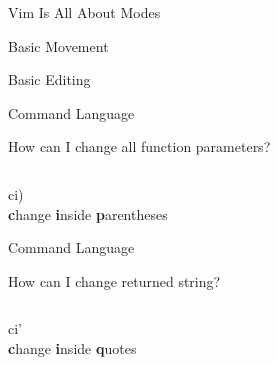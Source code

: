 \documentclass{beamer}
\begin{document}
\begin{frame}{Vim Is All About Modes}
\end{frame}
\usebackgroundtemplate{}

\begin{frame}{Basic Movement}
\end{frame}

\begin{frame}{Basic Editing}
\end{frame}


\begin{frame}{Command Language}
    \begin{block}{How can I change all function parameters?}
    \end{block}
    \inputminted{js}{codes/changeInsideParentheses.js}
    \pause
    \begin{center}
        \huge
        ci)
        \\
        \textbf{c}hange \textbf{i}nside \textbf{p}arentheses
    \end{center}
\end{frame}

\begin{frame}{Command Language}
    \begin{block}{How can I change returned string?}
    \end{block}
    \inputminted{js}{codes/changeInsideQuotes.js}
    \pause
    \begin{center}
        \huge
        ci'
        \\
        \textbf{c}hange \textbf{i}nside \textbf{q}uotes
    \end{center}
\end{frame}
\end{document}
